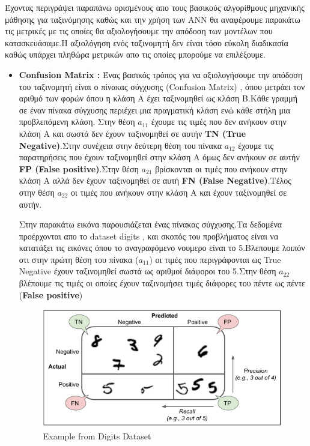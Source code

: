 \documentclass[12pt,a4paper]{article}
\begin{document}
Έχοντας περιγράψει παραπάνω ορισμένους απο τους βασικούς αλγορίθμους μηχανικής μάθησης για ταξινόμησης καθώς και την χρήση των ANN θα αναφέρουμε παρακάτω τις μετρικές με τις οποίες θα αξιολογήσουμε την απόδοση των μοντέλων που κατασκευάσαμε.Η αξιολόγηση ενός ταξινομητή δεν είναι τόσο εύκολη διαδικασία καθώς υπάρχει πληθώρα μετρικών απο τις οποίες μπορούμε να επιλέξουμε.




\begin{itemize}
\item \textbf{Confusion Matrix :} Ένας βασικός τρόπος για να αξιολογήσουμε την απόδοση του ταξινομητή είναι ο πίνακας σύγχυσης (Confusion Matrix) , όπου μετράει τον αριθμό των φορών όπου η κλάση A έχει ταξινομηθεί ως κλάση B.Κάθε γραμμή σε έναν πίνακα σύγχυσης περιέχει μια πραγματική κλάση ενώ κάθε στήλη μια προβλεπόμενη κλάση.
Στην θέση $a_{11}$ έχουμε τις τιμές που δεν ανήκουν στην κλάση Α και σωστά δεν έχουν ταξινομηθεί σε αυτήν \textbf{TN (True Negative)}.Στην συνέχεια στην δεύτερη θέση του πίνακα $a_{12}$ έχουμε τις παρατηρήσεις που έχουν ταξινομηθεί στην κλάση Α όμως δεν ανήκουν σε αυτήν \textbf{FP (False positive)}.Στην θέση $a_{21}$ βρίσκονται οι τιμές που ανήκουν στην κλάση Α αλλά δεν έχουν ταξινομηθεί σε αυτή \textbf{FN (False Negative)}.Τέλος στην θέση $a_{22}$ οι τιμές που ανήκουν στην κλάση Α και έχουν ταξινομηθεί σε αυτήν.




Στην παρακάτω εικόνα παρουσιάζεται ένας πίνακας σύγχυσης.Τα δεδομένα προέρχονται απο το dataset digits , και σκοπός του προβλήματος είναι να κατατάξει τις εικόνες όπου το αναγραφόμενο νουμερο είναι το 5.Βλεπουμε λοιπόν οτι στην πρώτη θέση του πίνακα ($a_{11}$) οι τιμές που περιγράφονται ως True Negative έχουν ταξινομηθεί σωστά ως αριθμοί διάφοροι του 5.Στην θέση $a_{22}$ βλέπουμε τις τιμές οι οποίες έχουν ταξινομήσει τιμές διάφορες του πέντε ως πέντε (\textbf{False positive})

\begin{figure}[H]
\centering
\includegraphics[width=0.60\linewidth,height=0.20\textheight]{Images/plot24}
\caption{Example from Digits Dataset}
\label{fig:multi}
\end{figure}


\end{itemize}
\end{document}
